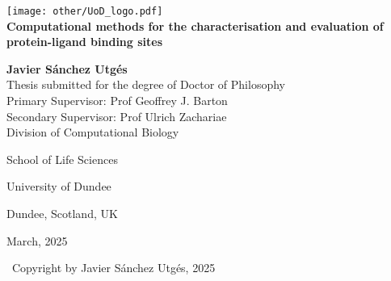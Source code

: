\begin{titlepage}

	\begin{center}
	
		\texttt{[image: other/UoD\_logo.pdf]}\\[1.5cm]
		
		{\Huge \textbf{Computational methods for the characterisation and evaluation of protein-ligand binding sites}}\\[1.5cm]
		
		{\LARGE \textbf{Javier Sánchez Utgés}}\\[1.5cm]
		
		{\Large Thesis submitted for the degree of Doctor of Philosophy}\\[1.5cm]
		
		{\large Primary Supervisor: Prof Geoffrey J. Barton}\\[0.25cm]

		{\large Secondary Supervisor: Prof Ulrich Zachariae}\\[0.25cm]
		
		
		{\normalsize Division of Computational Biology}
		
		{\normalsize School of Life Sciences}
		
		{\normalsize University of Dundee}
		
		{\normalsize Dundee, Scotland, UK}
		
		{\normalsize March, 2025}
		
		\vfill
		
		{\small \textcopyright\ Copyright by Javier Sánchez Utgés, 2025}

	\end{center}
	
\end{titlepage}
